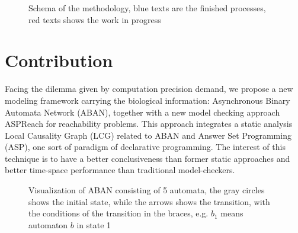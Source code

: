 \documentclass[final]{beamer}
\begin{document}
\begin{frame}[t]{}
\begin{columns}[t]
\begin{column}{.45\linewidth}
\begin{figure}
    \caption{Schema of the methodology, blue texts are the finished processes, red texts shows the work in progress}
\end{figure}

\section{Contribution}
Facing the dilemma given by computation precision demand, we propose a new modeling framework carrying the biological information: Asynchronous Binary Automata Network (ABAN), together with a new model checking approach ASPReach for reachability problems. 
This approach integrates a static analysis Local Causality Graph (LCG) \cite{pauleve2012} related to ABAN and Answer Set Programming (ASP), one sort of paradigm of declarative programming.
The interest of this technique is to have a better conclusiveness than former static approaches and better time-space performance than traditional model-checkers.

\begin{figure}
    \centering
    
    \caption{Visualization of ABAN consisting of 5 automata, the gray circles shows the initial state, while the arrows shows the transition, with the conditions of the transition in the braces, e.g. $b_1$ means automaton $b$ in state 1}
    \label{fig:my_label}
\end{figure}


\end{column}
\end{columns}
\end{frame}
\end{document}
